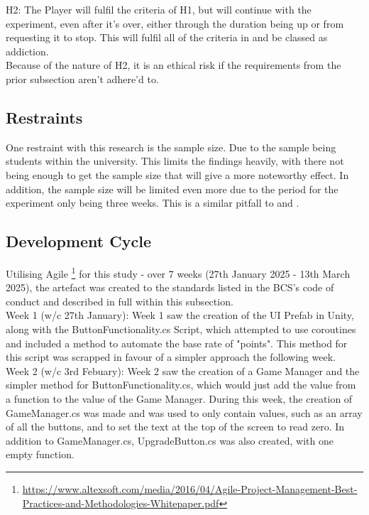 \documentclass[conference]{IEEEtran}
\begin{document}
H2: The Player will fulfil the criteria of H1, but will continue with the experiment, even after it's over, either through the duration being up or from requesting it to stop. This will fulfil all of the criteria in \cite{NHSHamp24} and be classed as addiction. \\

Because of the nature of H2, it is an ethical risk if the requirements from the prior subsection aren't adhere'd to.

\subsection {Restraints}
One restraint with this research is the sample size. Due to the sample being students within the university. This limits the findings heavily, with there not being enough to get the sample size that will give a more noteworthy effect. In addition, the sample size will be limited even more due to the period for the experiment only being three weeks. This is a similar pitfall to \cite{Naaj2021} and \cite{Ruqeyya2022}.\\

\subsection{Development Cycle}
Utilising Agile \footnote{\url{https://www.altexsoft.com/media/2016/04/Agile-Project-Management-Best-Practices-and-Methodologies-Whitepaper.pdf}} for this study - over 7 weeks (27th January 2025 - 13th March 2025), the artefact was created to the standards listed in the BCS's code of conduct and described in full within this subsection.\\


Week 1 (w/c 27th January): 
Week 1 saw the creation of the UI Prefab in Unity, along with the ButtonFunctionality.cs Script, which attempted to use coroutines and included a method to automate the base rate of "points". This method for this script was scrapped in favour of a simpler approach the following week.\\

Week 2 (w/c 3rd Febuary):
Week 2 saw the creation of a Game Manager and the simpler method for ButtonFunctionality.cs, which would just add the value from a function to the value of the Game Manager. During this week, the creation of GameManager.cs was made and was used to only contain values, such as an array of all the buttons, and to set the text at the top of the screen to read zero. In addition to GameManager.cs, UpgradeButton.cs was also created, with one empty function.\\
\end{document}
